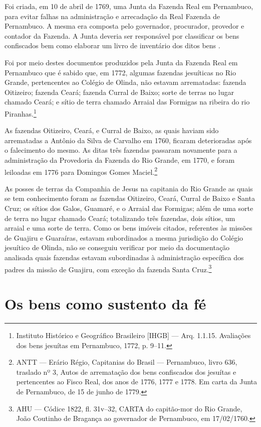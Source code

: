 Foi criada, em 10 de abril de 1769, uma Junta da Fazenda Real em Pernambuco, para evitar falhas na administração e arrecadação da Real Fazenda de Pernambuco. A mesma era composta pelo governador, procurador, provedor e contador da Fazenda. A Junta deveria ser responsável por classificar os bens confiscados bem como elaborar um livro de inventário dos ditos bens \cite[p.~158]{Couto1990}. 

Foi por meio destes documentos produzidos pela Junta da Fazenda Real em Pernambuco que é sabido que, em 1772, algumas fazendas jesuíticas no Rio Grande, pertencentes ao Colégio de Olinda, não estavam arrematadas: fazenda Oitizeiro; fazenda Ceará; fazenda Curral de Baixo; sorte de terras no lugar chamado Ceará; e sítio de terra chamado Arraial das Formigas na ribeira do rio Piranhas.\footnote{Instituto Histórico e Geográfico Brasileiro [IHGB] --- Arq. 1.1.15. Avaliações dos bens jesuítas em Pernambuco, 1772, p. 9--11.} 

As fazendas Oitizeiro, Ceará, e Curral de Baixo, as quais haviam sido arrematadas a Antônio da Silva de Carvalho em 1760, ficaram deterioradas após o falecimento do mesmo. As ditas três fazendas passaram novamente para a administração da Provedoria da Fazenda do Rio Grande, em 1770, e foram leiloadas em 1776 para Domingos Gomes Maciel.\footnote{ANTT --- Erário Régio, Capitanias do Brasil --- Pernambuco, livro 636, traslado nº 3, Autos de arrematação dos bens confiscados dos jesuítas e pertencentes ao Fisco Real, dos anos de 1776, 1777 e 1778. Em carta da Junta de Pernambuco, de 15 de junho de 1779.}  

As posses de terras da Companhia de Jesus na capitania do Rio Grande as quais se tem conhecimento foram as fazendas Oitizeiro, Ceará, Curral de Baixo e Santa Cruz; os sítios dos Galos, Guamaré, e o Arraial das Formigas; além de uma sorte de terra no lugar chamado Ceará; totalizando três fazendas, dois sítios, um arraial e uma sorte de terra. Como os bens imóveis citados, referentes às missões de Guajiru e Guaraíras, estavam subordinados a mesma jurisdição do Colégio jesuítico de Olinda, não se conseguiu verificar por meio da documentação analisada quais fazendas estavam subordinadas à administração específica dos padres da missão de Guajiru, com exceção da fazenda Santa Cruz.\footnote{AHU --- Códice 1822, fl. 31v--32, CARTA do capitão-mor do Rio Grande, João Coutinho de Bragança ao governador de Pernambuco, em 17/02/1760.}

\section{Os bens como sustento da fé}


